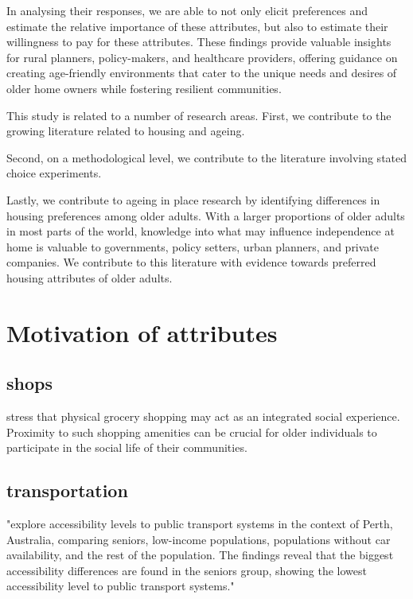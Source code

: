 \documentclass[3p,11pt ]{elsarticle}
\begin{document}
In analysing their responses, we are able to not only elicit preferences and estimate the relative importance of these attributes,
but also to estimate their willingness to pay for these attributes.
These findings provide valuable insights for rural planners, policy-makers, and healthcare providers, offering guidance on creating age-friendly environments that cater to the unique needs and desires of older home owners while fostering resilient communities.


This study is related to a number of research areas.
First,
we contribute to the growing literature related to housing and ageing.

Second,
on a methodological level, we contribute to the literature involving stated choice experiments.

Lastly,
we contribute to ageing in place research by identifying differences in housing preferences among older adults.
With a larger proportions of older adults in most parts of the world,
knowledge into what may influence independence at home is valuable to governments, policy setters, urban planners, and private companies.
We contribute to this literature with evidence towards preferred housing attributes of older adults.



\section{Motivation of attributes}

\subsection{shops}

\cite{lucasMethodEvaluateEquitable2016} stress that physical grocery shopping may act as an integrated social experience.  Proximity to such shopping amenities can be crucial for older individuals to participate in the social life of their communities. 


\subsection{transportation}

\cite{ricciardiExploringPublicTransport2015} "explore accessibility levels to public transport systems in the context of Perth, Australia, comparing seniors, low-income populations, populations without car availability, and the rest of the population. The findings reveal that the biggest accessibility differences are found in the seniors group, showing the lowest accessibility level to public transport systems."
\end{document}
